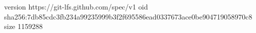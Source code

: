 version https://git-lfs.github.com/spec/v1
oid sha256:7db85cdc3fb234a99235999b3f2f695586ead0337673ace0be904719058970c8
size 1159288
